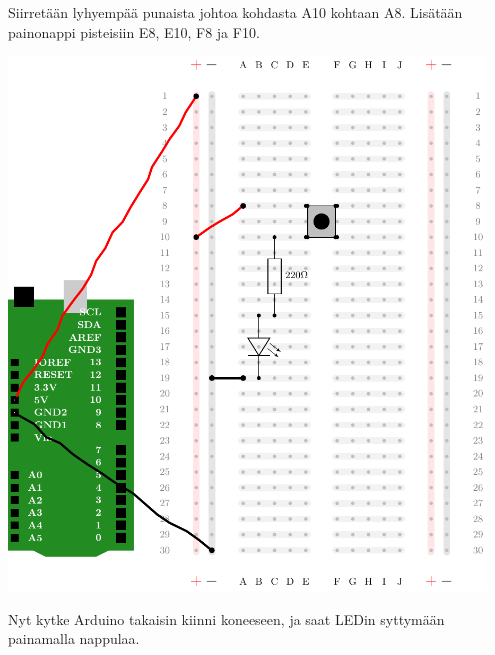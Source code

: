 Siirretään lyhyempää punaista johtoa kohdasta A10 kohtaan A8. Lisätään painonappi pisteisiin E8, E10, F8 ja F10.

\includegraphics[width=0.95\textwidth]{kuvat/kuva6.pdf}

Nyt kytke Arduino takaisin kiinni koneeseen, ja saat LEDin syttymään painamalla nappulaa. 

